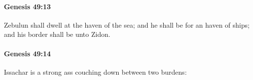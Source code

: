 		\paragraph{Genesis 49:13} %
			\label{GENESIS-49-13}

			Zebulun shall dwell at the haven of the sea; and he shall be for an haven of ships; and his border shall be unto Zidon.


		\paragraph{Genesis 49:14} %
			\label{GENESIS-49-14}

			Issachar is a strong ass couching down between two burdens:


